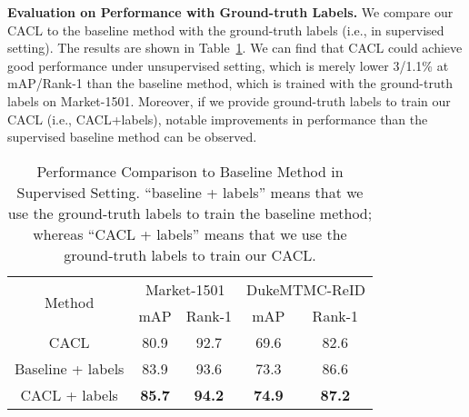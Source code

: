 \documentclass[journal]{IEEEtran}
\def\ie{i.e.}
\newcommand{\myparagraph}[1]{\noindent\textbf{#1.}}
\begin{document}
\myparagraph{Evaluation on Performance with Ground-truth Labels}  We compare our CACL to the baseline method with the ground-truth labels (\ie, in supervised setting). The results are shown in Table~\ref{Tab:orac}. We can find that CACL could achieve good performance under unsupervised setting, which is merely lower 3/1.1\% at mAP/Rank-1 than the baseline method, which is trained with the ground-truth labels on Market-1501. Moreover, if we provide ground-truth labels to train our CACL (\ie, CACL+labels), notable improvements in performance than the supervised baseline method can be observed. 



\begin{table}
\begin{center}
\caption{Performance Comparison to Baseline Method in Supervised Setting. ``baseline + labels'' means that we use the ground-truth labels to train the baseline method; whereas ``CACL + labels'' means that we use the ground-truth labels to train our CACL.
}
\begin{tabular}{|c|c|c|c|c|}
					\hline		
					\multirow{2}{*}{Method} & \multicolumn{2}{c|}{Market-1501}&\multicolumn{2}{c|}{DukeMTMC-ReID}\\
					\cline{2-5}  
					& mAP & Rank-1  & mAP & Rank-1 \\
					
\hline\hline



CACL                &{80.9}&{92.7}&{69.6}&{ {82.6}}\\
Baseline + labels   &83.9& 93.6&73.3& 86.6\\
CACL + labels       &{\bf 85.7 }&{\bf 94.2 }&{\bf74.9}&{\bf87.2}\\
\hline

\end{tabular}
\label{Tab:orac}
\end{center}


\end{table}
\end{document}

